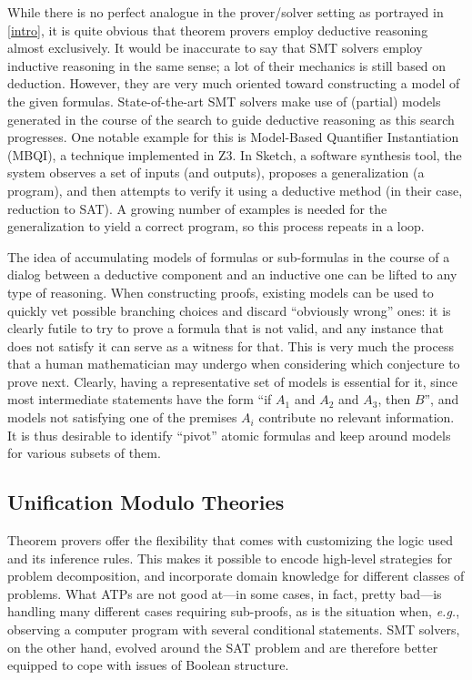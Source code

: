 While there is no perfect analogue in the prover/solver setting as portrayed
in \autoref{intro}, it is quite obvious that theorem provers employ deductive
reasoning almost exclusively.
It would be inaccurate to say that SMT solvers employ inductive reasoning in
the same sense; a lot of their mechanics is still based on deduction.
However, they are very much oriented toward constructing a model of the given formulas.
State-of-the-art SMT solvers make use of (partial) models generated in the
course of the search to guide deductive reasoning as this search progresses.
One notable example for this is Model-Based Quantifier Instantiation (MBQI),
a technique implemented in Z3.
In Sketch, a software synthesis tool, the system observes a set of inputs (and
outputs), proposes a generalization (a program), and then attempts to verify it
using a deductive method (in their case, reduction to SAT).
A growing number of examples is needed for the generalization to yield a correct
program, so this process repeats in a loop.

The idea of accumulating models of formulas or sub-formulas in the course of
a dialog between a deductive component and an inductive one can be lifted to
any type of reasoning.
When constructing proofs, existing models can be used to quickly vet possible
branching choices and discard ``obviously wrong'' ones: it is clearly futile
to try to prove a formula that is not valid, and any instance that does not
satisfy it can serve as a witness for that.
This is very much the process that a human mathematician may undergo when
considering which conjecture to prove next.
Clearly, having a representative set of models is essential for it, since
most intermediate statements have the form ``if $A_1$ and $A_2$ and $A_3$, then
$B$'', and models not satisfying one of the premises $A_i$ contribute no
relevant information.
It is thus desirable to identify ``pivot'' atomic formulas and keep around
models for various subsets of them.


\subsection{Unification Modulo Theories}

Theorem provers offer the flexibility that comes with customizing the logic used and its inference rules.
This makes it possible to encode high-level strategies for problem decomposition, and incorporate domain knowledge for different classes of problems.
What ATPs are not good at---in some cases, in fact, pretty bad---is
handling many different cases requiring sub-proofs,
as is the situation when, \emph{e.g.}, observing a computer program with several conditional statements.
SMT solvers, on the other hand, evolved around the SAT problem and are therefore better equipped to cope with issues of Boolean structure.

